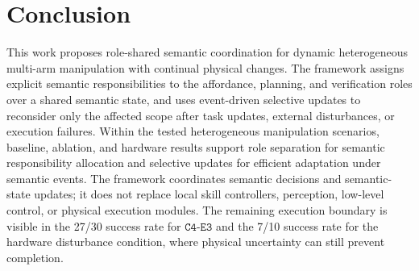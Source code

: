 \section{Conclusion}
\label{sec:conclusion}

This work proposes role-shared semantic coordination for dynamic heterogeneous
multi-arm manipulation with continual physical changes. The framework assigns
explicit semantic responsibilities to the affordance, planning, and
verification roles over a shared semantic state, and uses event-driven
selective updates to reconsider only the affected scope after task updates,
external disturbances, or execution failures. Within the tested heterogeneous
manipulation scenarios, baseline, ablation, and hardware results support role
separation for semantic responsibility allocation and selective updates for
efficient adaptation under semantic events.
The framework coordinates semantic decisions and semantic-state updates; it
does not replace local skill controllers, perception, low-level control, or
physical execution modules. The remaining execution boundary is visible in the
27/30 success rate for $\texttt{C4-E3}$ and the 7/10 success rate
for the hardware disturbance condition, where physical uncertainty can still
prevent completion.
